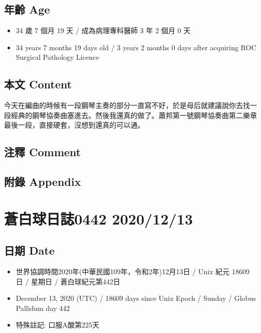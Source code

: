 \documentclass[
]{article}
\providecommand{\tightlist}{%
  \setlength{\itemsep}{0pt}\setlength{\parskip}{0pt}}
\begin{document}
\hypertarget{ux5e74ux9f61-age-11}{%
\subsection{年齡 Age}\label{ux5e74ux9f61-age-11}}

\begin{itemize}
\tightlist
\item
  34 歲 7 個月 19 天 / 成為病理專科醫師 3 年 2 個月 0 天
\item
  34 years 7 months 19 days old / 3 years 2 months 0 days after
  acquiring ROC Surgical Pathology Licence
\end{itemize}

\hypertarget{ux672cux6587-content-11}{%
\subsection{本文 Content}\label{ux672cux6587-content-11}}

今天在編曲的時候有一段鋼琴主奏的部分一直寫不好，於是母后就建議說你去找一段經典的鋼琴協奏曲塞進去。然後我還真的做了。蕭邦第一號鋼琴協奏曲第二樂章最後一段，直接硬套，沒想到還真的可以通。

\hypertarget{ux6ce8ux91cb-comment-11}{%
\subsection{注釋 Comment}\label{ux6ce8ux91cb-comment-11}}

\hypertarget{ux9644ux9304-appendix-11}{%
\subsection{附錄 Appendix}\label{ux9644ux9304-appendix-11}}

\hypertarget{ux84bcux767dux7403ux65e5ux8a8c0442-20201213}{%
\section{蒼白球日誌0442
2020/12/13}\label{ux84bcux767dux7403ux65e5ux8a8c0442-20201213}}

\hypertarget{ux65e5ux671f-date-12}{%
\subsection{日期 Date}\label{ux65e5ux671f-date-12}}

\begin{itemize}
\tightlist
\item
  世界協調時間2020年(中華民國109年，令和2年)12月13日 / Unix 紀元 18609
  日 / 星期日 / 蒼白球紀元第442日
\item
  December 13, 2020 (UTC) / 18609 days since Unix Epoch / Sunday /
  Globus Pallidum day 442
\item
  特殊註記: 口服A酸第225天
\end{itemize}
\end{document}
